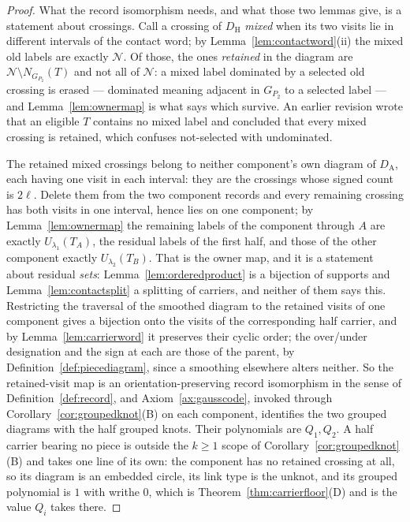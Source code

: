 \begin{proof}
What the record isomorphism needs, and what those two lemmas give, is a
statement about crossings. Call a crossing of $D_{\mathrm H}$ \emph{mixed} when
its two visits lie in different intervals of the contact word; by
Lemma~\ref{lem:contactword}(ii) the mixed old labels are exactly $\mathcal N$.
Of those, the ones \emph{retained} in the diagram are
$\mathcal N\setminus N_{G_{P_2}}(T)$
and not all of $\mathcal N$: a mixed label dominated by a selected old crossing
is erased --- dominated meaning adjacent in $G_{P_2}$ to a selected label ---
and Lemma~\ref{lem:ownermap} is what says which survive. An
earlier revision wrote that an eligible $T$ contains no mixed label and
concluded that every mixed crossing is retained, which confuses not-selected
with undominated.

The retained mixed crossings belong to neither component's own diagram of
$D_{\mathrm A}$, each having one visit in each interval: they are the crossings
whose signed count is $2\ell$. Delete them from the two component records and
every remaining crossing has both visits in one interval, hence lies on one
component; by Lemma~\ref{lem:ownermap} the remaining labels of the
component through $A$ are exactly $U_{\lambda_1}(T_A)$, the residual labels of
the first half, and those of the other component exactly
$U_{\lambda_2}(T_B)$. That is the owner map, and it is a statement about
residual \emph{sets}: Lemma~\ref{lem:orderedproduct} is a bijection of supports
and Lemma~\ref{lem:contactsplit} a splitting of carriers, and neither of them
says this. Restricting the traversal
of the smoothed diagram to the retained visits of one component gives a
bijection onto the visits of the corresponding half carrier, and by
Lemma~\ref{lem:carrierword} it preserves their cyclic order; the over/under
designation and the sign at each are those of the parent, by
Definition~\ref{def:piecediagram}, since a smoothing elsewhere alters neither.
So the retained-visit map is an orientation-preserving record isomorphism in the
sense of Definition~\ref{def:record}, and Axiom~\ref{ax:gausscode}, invoked
through Corollary~\ref{cor:groupedknot}(B) on each component, identifies the two
grouped diagrams with the half grouped knots. Their polynomials are $Q_1,Q_2$.
A half carrier bearing no piece is outside the $k\geq1$ scope of
Corollary~\ref{cor:groupedknot}(B) and takes one line of its own: the component has
no retained crossing at all, so its diagram is an embedded circle, its link type
is the unknot, and its grouped polynomial is $1$ with writhe $0$, which is
Theorem~\ref{thm:carrierfloor}(D) and is the value $Q_i$ takes there.


\end{proof}
